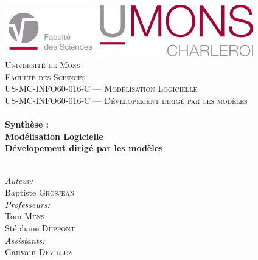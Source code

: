 

\begin{titlepage}

\begin{center}
\includegraphics[width=0.3\textwidth]{./Images/Logos/fs.pdf}\hfill
\includegraphics[width=0.5\textwidth]{./Images/Logos/umons_charleroi.png}\\[0.6cm]
\textsc{\LARGE Universit\'e de Mons}\\[0.4cm]
\textsc{\LARGE Facult\'e des Sciences}\\[1.5cm]
\textsc{\Large US-MC-INFO60-016-C — Modélisation Logicielle }\\[0.5cm]
\textsc{\Large US-MC-INFO60-016-C — Dévelopement dirigé par les modèles }\\[0.5cm]
\HRule \\[0.4cm]
{ \huge \bfseries Synthèse :}\\[0.2cm]
{ \huge \bfseries Modélisation Logicielle}\\[0.4cm]
{ \huge \bfseries Dévelopement dirigé par les modèles}\\[0.4cm]
\HRule \\[0.4cm]
\begin{minipage}{0.4\textwidth}
\begin{flushleft} \large
\emph{Auteur:}\\
Baptiste \textsc{Grosjean}\\
\emph{Professeurs:}\\
Tom \textsc{Mens}\\
Stéphane \textsc{Duppont}\\
\emph{Assistants:}\\
Gauvain \textsc{Devillez}\\
\end{flushleft}
\end{minipage}
\begin{minipage}{0.4\textwidth}
\begin{flushright} \large

\end{flushright}
\end{minipage}
\end{center}
\end{titlepage}
